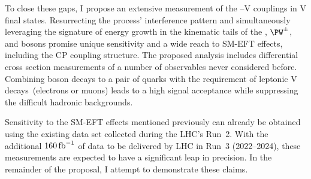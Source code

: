 \documentclass[a4paper,11pt]{article}
\newcommand{\Pb}{{{\Pqb}}\xspace}
\newcommand{\PAb}{{{{\Paqb}}}\xspace}
\renewcommand{\PV}{{{{V}}}\xspace}
\newcommand{\VH}{{{\PV}{\PH}}\xspace}
\begin{document}
To close these gaps, I propose an extensive measurement of the \PH--\PV couplings in \VH final states. 
Resurrecting the process' interference pattern and simultaneously leveraging the signature of energy growth in the kinematic tails of the \PH, $\PW^{\pm}$, and \PZ bosons promise unique sensitivity and a wide reach to SM-EFT effects, including the CP coupling structure.
The proposed analysis includes differential cross section measurements of a number of observables never considered before.
Combining \PH boson decays to a pair of \Pb quarks with the requirement of leptonic \PV decays~(electrons or muons) leads to a high signal acceptance while suppressing the difficult hadronic backgrounds.  




Sensitivity to the SM-EFT effects mentioned previously can already be obtained using the existing data set collected during the LHC's Run~2. 
With the additional $160\mbox{\ensuremath{\,\text{fb}^{-1}}}$ of data to be delivered by LHC in Run~3 (2022--2024), these measurements are expected to have a significant leap in precision. 
In the remainder of the proposal, I attempt to demonstrate these claims.
\end{document}

